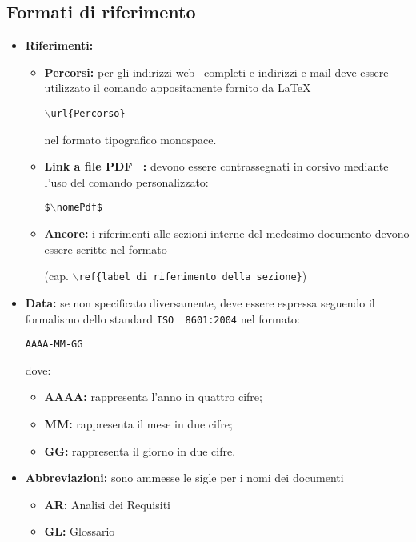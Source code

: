 {	\subsection{Formati di riferimento}{
		\label{formatiRiferimento}
		\begin{itemize}
			\item \textbf{Riferimenti:}
			\begin{itemize}
				\item \textbf{Percorsi:} per gli indirizzi web\g~ completi e indirizzi e-mail deve essere utilizzato il comando appositamente fornito da \LaTeX
				\begin{center}
					\texttt{$\backslash$url\{Percorso\}}
				\end{center}
				nel formato tipografico monospace.
				\item \textbf{Link a file PDF\g~ :} devono essere contrassegnati in corsivo mediante l'uso del comando personalizzato:
				\begin{center}
					\texttt{\$$\backslash$nomePdf\$}
				\end{center}
				\item \textbf{Ancore:} i riferimenti alle sezioni interne del medesimo documento devono essere scritte nel formato
				\begin{center}
					(cap. \texttt{$\backslash$ref\{label di riferimento della sezione\}})
				\end{center}
			\end{itemize}
			\item \textbf{Data:} se non specificato diversamente, deve essere espressa seguendo il formalismo dello standard \texttt{ISO\g~ 8601:2004} nel formato:
			\begin{center}
				\texttt{AAAA-MM-GG}
			\end{center}
			dove:
			\begin{itemize}
				\item [] \textbf{AAAA:} rappresenta l'anno in quattro cifre;
				\item [] \textbf{MM:} rappresenta il mese in due cifre;
				\item [] \textbf{GG:} rappresenta il giorno in due cifre.
			\end{itemize}
			\item \textbf{Abbreviazioni:} sono ammesse le sigle per i nomi dei documenti
			\begin{itemize}
				\item [] \textbf{AR:} Analisi dei Requisiti
				\item [] \textbf{GL:} Glossario

\end{itemize}
\end{itemize}}}
